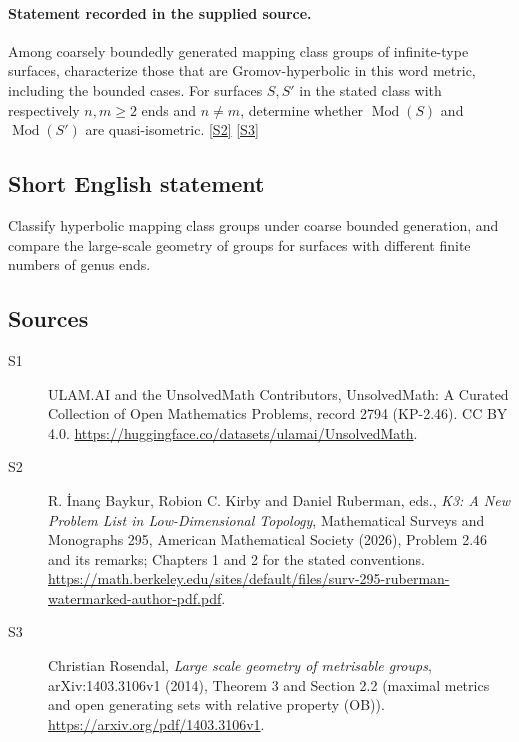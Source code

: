 \documentclass[11pt]{article}
\newcommand{\sref}[2]{\hyperlink{source:#1:#2}{[S#2]}}
\begin{document}
\paragraph{Statement recorded in the supplied source.}
Among coarsely boundedly generated mapping class groups of infinite-type surfaces, characterize those that are Gromov-hyperbolic in this word metric, including the bounded cases. For surfaces $S,S'$ in the stated class with respectively $n,m\ge2$ ends and $n\ne m$, determine whether $\operatorname{Mod}(S)$ and $\operatorname{Mod}(S')$ are quasi-isometric. \sref{2794}{2} \sref{2794}{3}

\subsection{Short English statement}
Classify hyperbolic mapping class groups under coarse bounded generation, and compare the large-scale geometry of groups for surfaces with different finite numbers of genus ends.
\subsection{Sources}
\begin{description}
\item[\hypertarget{source:2794:1}{S1}] ULAM.AI and the UnsolvedMath Contributors, UnsolvedMath: A Curated Collection of Open Mathematics Problems, record 2794 (KP-2.46). CC BY 4.0. \url{https://huggingface.co/datasets/ulamai/UnsolvedMath}.
\item[\hypertarget{source:2794:2}{S2}] R. İnanç Baykur, Robion C. Kirby and Daniel Ruberman, eds., \emph{K3: A New Problem List in Low-Dimensional Topology}, Mathematical Surveys and Monographs 295, American Mathematical Society (2026), Problem 2.46 and its remarks; Chapters 1 and 2 for the stated conventions. \url{https://math.berkeley.edu/sites/default/files/surv-295-ruberman-watermarked-author-pdf.pdf}.
\item[\hypertarget{source:2794:3}{S3}] Christian Rosendal, \emph{Large scale geometry of metrisable groups}, arXiv:1403.3106v1 (2014), Theorem 3 and Section 2.2 (maximal metrics and open generating sets with relative property (OB)). \url{https://arxiv.org/pdf/1403.3106v1}.
\end{description}
\label{end:2794}
\end{document}
